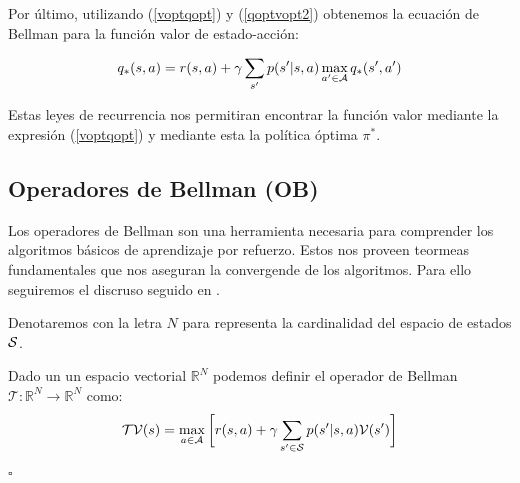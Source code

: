 Por último, utilizando (\ref{voptqopt}) y (\ref{qoptvopt2}) obtenemos  la ecuación de Bellman para la función valor de estado-acción:
\begin{cor}
    \begin{gather}
        q_*(s,a) = r(s,a) +  \gamma \sum_{s'}  p(s'|s,a) \max_{a'\in \mathcal{A}}q_*(s',a')
    \end{gather}
\end{cor}


Estas leyes de recurrencia nos permitiran encontrar la función valor mediante la expresión (\ref{voptqopt}) y mediante esta la política óptima $\pi^*$.



\subsection{Operadores de Bellman (OB)}

Los operadores de Bellman son una herramienta necesaria para comprender los algoritmos básicos de aprendizaje por refuerzo. Estos nos proveen teormeas fundamentales que nos aseguran la convergende de los algoritmos. Para ello seguiremos el discruso seguido en \cite{LAZARIC}. \newline

Denotaremos con la letra $N$ para representa la cardinalidad del espacio de estados $\mathcal{S}$.



\begin{defi}
    Dado un un espacio vectorial $\mathbb{R}^N$ podemos definir el operador de Bellman $\mathcal{T}:\mathbb{R}^N \rightarrow \mathbb{R}^N$ como:
    \begin{gather}
        \mathcal{T} \mathcal{V}(s) = \max_{a\in\mathcal{A}} \bigg[ r(s,a) + \gamma \sum_{s' \in \mathcal{S}} p(s'|s,a) \mathcal{V}(s') \bigg]
    \end{gather}
    \hfill\ensuremath{\square}
\end{defi}


